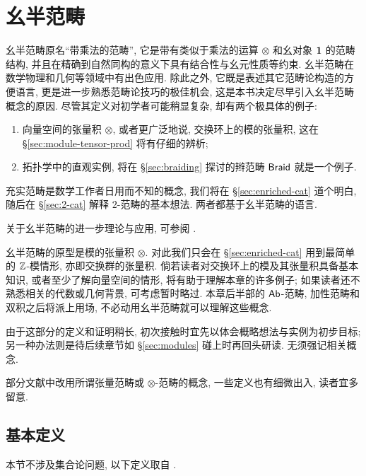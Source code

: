 
\chapter{幺半范畴}\label{sec:monoidal-cat}
幺半范畴原名``带乘法的范畴'', 它是带有类似于乘法的运算 $\otimes$ 和幺对象 $\mathbf{1}$ 的范畴结构, 并且在精确到自然同构的意义下具有结合性与幺元性质等约束. 幺半范畴在数学物理和几何等领域中有出色应用. 除此之外, 它既是表述其它范畴论构造的方便语言, 更是进一步熟悉范畴论技巧的极佳机会, 这是本书决定尽早引入幺半范畴概念的原因. 尽管其定义对初学者可能稍显复杂, 却有两个极具体的例子:
\begin{enumerate}
	\item 向量空间的张量积 $\otimes$, 或者更广泛地说, 交换环上的模的张量积, 这在 \S\ref{sec:module-tensor-prod} 将有仔细的辨析;
	\item 拓扑学中的直观实例, 将在 \S\ref{sec:braiding} 探讨的辫范畴 $\mathsf{Braid}$ 就是一个例子.
\end{enumerate}

充实范畴是数学工作者日用而不知的概念, 我们将在 \S\ref{sec:enriched-cat} 道个明白, 随后在 \S\ref{sec:2-cat} 解释 $2$-范畴的基本想法. 两者都基于幺半范畴的语言.

关于幺半范畴的进一步理论与应用, 可参阅 \cite{EGNO15}.

\begin{wenxintishi}
	幺半范畴的原型是模的张量积 $\otimes$. 对此我们只会在 \S\ref{sec:enriched-cat} 用到最简单的 $\mathbb{Z}$-模情形, 亦即交换群的张量积. 倘若读者对交换环上的模及其张量积具备基本知识, 或者至少了解向量空间的情形, 将有助于理解本章的许多例子; 如果读者还不熟悉相关的代数或几何背景, 可考虑暂时略过. 本章后半部的 $\mathsf{Ab}$-范畴, 加性范畴和双积之后将派上用场, 不必动用幺半范畴就可以理解这些概念.

	由于这部分的定义和证明稍长, 初次接触时宜先以体会概略想法与实例为初步目标; 另一种办法则是待后续章节如 \S\ref{sec:modules} 碰上时再回头研读. 无须强记相关概念.

	部分文献中改用所谓张量范畴或 $\otimes$-范畴的概念, 一些定义也有细微出入, 读者宜多留意. 
\end{wenxintishi}

\section{基本定义}\label{sec:monoidal-cat-def}
本节不涉及集合论问题, 以下定义取自 \cite[\S 2.1]{EGNO15}.

